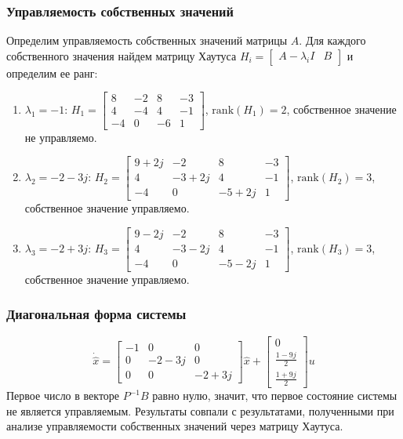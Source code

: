 \subsubsection{Управляемость собственных значений}
Определим управляемость собственных значений матрицы $A$. Для каждого собственного значения найдем матрицу Хаутуса $H_i = \begin{bmatrix} A - \lambda_i I & B \end{bmatrix}$ и определим ее ранг:
\begin{enumerate}
    \item $\lambda_1 = -1$: $H_1 = \begin{bmatrix}
        8 & -2 & 8 & -3\\
        4 & -4 & 4 & -1 \\
        -4 & 0 & -6 & 1
    \end{bmatrix}$, $\text{rank}(H_1) = 2$, собственное значение не управляемо.
    \item $\lambda_2 = -2-3j$: $H_2 = \begin{bmatrix}
        9+2j & -2 & 8 & -3\\
        4 & -3+2j & 4 & -1 \\
        -4 & 0 & -5+2j & 1
    \end{bmatrix}$, $\text{rank}(H_2) = 3$, собственное значение управляемо.
    \item $\lambda_3 = -2+3j$: $H_3 = \begin{bmatrix}
        9-2j & -2 & 8 & -3\\
        4 & -3-2j & 4 & -1 \\
        -4 & 0 & -5-2j & 1
    \end{bmatrix}$, $\text{rank}(H_3) = 3$, собственное значение управляемо.
\end{enumerate}

\subsubsection{Диагональная форма системы}
\begin{equation}
    \dot{\hat{x}} = \begin{bmatrix}
        -1 & 0 & 0 \\
        0 & -2-3j & 0 \\
        0 & 0 & -2+3j
    \end{bmatrix} \hat{x} + 
    \begin{bmatrix}
        0 \\
        \frac{1 - 9j}{2} \\ 
        \frac{1 + 9j}{2}
    \end{bmatrix} u
\end{equation}
Первое число в векторе $P^{-1}B$ равно нулю, значит, что первое состояние системы не является управляемым. 
Результаты совпали с результатами, полученными при анализе управляемости собственных значений через матрицу Хаутуса.

